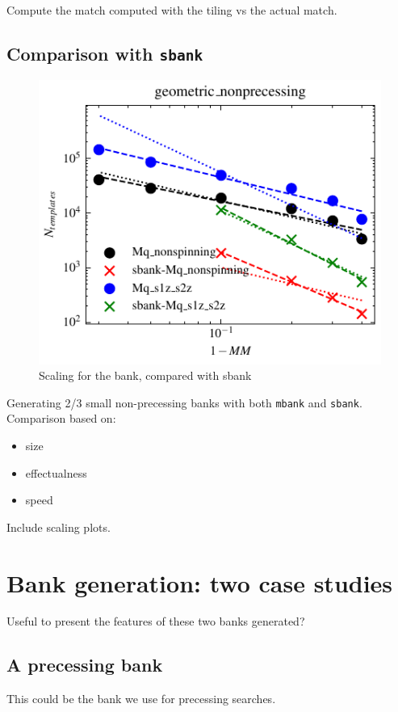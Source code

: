 \documentclass[twocolumn,showpacs,preprintnumbers,nofootinbib,prd,
superscriptaddress,10pt]{revtex4-1}
\begin{document}
Compute the match computed with the tiling vs the actual match.

\subsection{Comparison with \texttt{sbank} }

\begin{figure}[h]
	\includegraphics{bank_scaling_nonprecessing_geometric}
	\caption{Scaling for the bank, compared with sbank}
	\label{fig:bank_scaling}
\end{figure}

Generating 2/3 small non-precessing banks with both \texttt{mbank} and \texttt{sbank}.
Comparison based on:
	\begin{itemize}
		\item size
		\item effectualness
		\item speed
	\end{itemize}

Include scaling plots.

\section{Bank generation: two case studies} \label{sec:bank_generation}

Useful to present the features of these two banks generated?

\subsection{A precessing bank}
This could be the bank we use for precessing searches.
\end{document}

